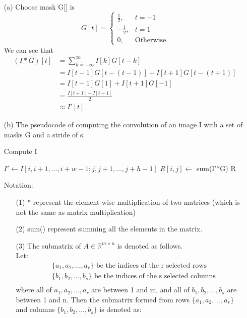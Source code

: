 \documentclass[a4paper,12pt]{article}
\begin{document}
\begin{enumerate}
\item[(a)]
Choose mask G[] is
$$
G[t] = 
\begin{cases}
\frac{1}{2}, & t = -1 \\
-\frac{1}{2}, & t = 1 \\
0,&\text{Otherwise}
\end{cases}
$$
We can see that
\begin{align*}
(I * G)[t]
&= \sum_{k=-\infty}^{\infty} I[k] G[t-k]\\
&= I[t-1] G[t - (t-1)] + I[t+1] G[t - (t+1)]  \\
&= I[t-1] G[1] + I[t+1] G[-1] \\
&= \frac{ I[t+1] -  I[t-1]}{2} \\
&\approx I'[t]
\end{align*}


\clearpage
\item[(b)]
The pseudocode of computing the convolution of an image I with a set of masks G and a stride of s.
\begin{algorithm}
\caption{Compute I}
\begin{algorithmic} 
\STATE $I' \leftarrow I[i,i+1,\ldots,i+w-1; j,j+1,\ldots,j+h-1]$
\STATE $R[i,j] \leftarrow$ sum(I'*G)
\ENDFOR
\ENDFOR
\RETURN R
\end{algorithmic}
\end{algorithm}

Notation:
\begin{itemize}
\item[(1)] * represent the element-wise multiplication of two matrices (which is not the same as matrix multiplication)
\item[(2)] sum() represent summing all the elements in the matrix.
\item[(3)] The submatrix of $A \in \mathbb{R}^{m\times n}$ is denoted as follows.\\
Let:
\begin{align*}
&\{a_1,a_2,\ldots,a_r\} \text{ be the indices of the r selected rows} \\
&\{b_1,b_2,\ldots,b_s\} \text{ be the indices of the s selected columns} \\
\end{align*}
where all of $a_1,a_2,\ldots,a_r$ are between 1 and m, and all of $b_1,b_2,\ldots,b_s$ are between 1 and n. Then the submatrix formed from rows $\{a_1,a_2,\ldots,a_r\}$ and columns $\{b_1,b_2,\ldots,b_s\}$ is denoted as:


\end{itemize}
\end{enumerate}
\end{document}
